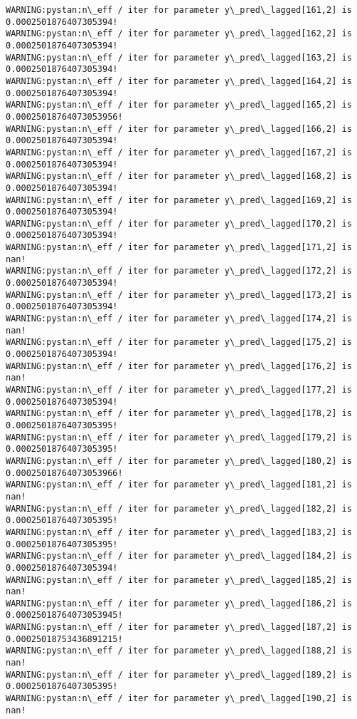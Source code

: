 \documentclass[11pt]{article}
\begin{document}
\begin{Verbatim}[commandchars=\\\{\}]
WARNING:pystan:n\_eff / iter for parameter y\_pred\_lagged[161,2] is 0.0002501876407305394!
WARNING:pystan:n\_eff / iter for parameter y\_pred\_lagged[162,2] is 0.0002501876407305394!
WARNING:pystan:n\_eff / iter for parameter y\_pred\_lagged[163,2] is 0.0002501876407305394!
WARNING:pystan:n\_eff / iter for parameter y\_pred\_lagged[164,2] is 0.0002501876407305394!
WARNING:pystan:n\_eff / iter for parameter y\_pred\_lagged[165,2] is 0.00025018764073053956!
WARNING:pystan:n\_eff / iter for parameter y\_pred\_lagged[166,2] is 0.0002501876407305394!
WARNING:pystan:n\_eff / iter for parameter y\_pred\_lagged[167,2] is 0.0002501876407305394!
WARNING:pystan:n\_eff / iter for parameter y\_pred\_lagged[168,2] is 0.0002501876407305394!
WARNING:pystan:n\_eff / iter for parameter y\_pred\_lagged[169,2] is 0.0002501876407305394!
WARNING:pystan:n\_eff / iter for parameter y\_pred\_lagged[170,2] is 0.0002501876407305394!
WARNING:pystan:n\_eff / iter for parameter y\_pred\_lagged[171,2] is nan!
WARNING:pystan:n\_eff / iter for parameter y\_pred\_lagged[172,2] is 0.0002501876407305394!
WARNING:pystan:n\_eff / iter for parameter y\_pred\_lagged[173,2] is 0.0002501876407305394!
WARNING:pystan:n\_eff / iter for parameter y\_pred\_lagged[174,2] is nan!
WARNING:pystan:n\_eff / iter for parameter y\_pred\_lagged[175,2] is 0.0002501876407305394!
WARNING:pystan:n\_eff / iter for parameter y\_pred\_lagged[176,2] is nan!
WARNING:pystan:n\_eff / iter for parameter y\_pred\_lagged[177,2] is 0.0002501876407305394!
WARNING:pystan:n\_eff / iter for parameter y\_pred\_lagged[178,2] is 0.0002501876407305395!
WARNING:pystan:n\_eff / iter for parameter y\_pred\_lagged[179,2] is 0.0002501876407305395!
WARNING:pystan:n\_eff / iter for parameter y\_pred\_lagged[180,2] is 0.00025018764073053966!
WARNING:pystan:n\_eff / iter for parameter y\_pred\_lagged[181,2] is nan!
WARNING:pystan:n\_eff / iter for parameter y\_pred\_lagged[182,2] is 0.0002501876407305395!
WARNING:pystan:n\_eff / iter for parameter y\_pred\_lagged[183,2] is 0.0002501876407305395!
WARNING:pystan:n\_eff / iter for parameter y\_pred\_lagged[184,2] is 0.0002501876407305394!
WARNING:pystan:n\_eff / iter for parameter y\_pred\_lagged[185,2] is nan!
WARNING:pystan:n\_eff / iter for parameter y\_pred\_lagged[186,2] is 0.00025018764073053945!
WARNING:pystan:n\_eff / iter for parameter y\_pred\_lagged[187,2] is 0.00025018753436891215!
WARNING:pystan:n\_eff / iter for parameter y\_pred\_lagged[188,2] is nan!
WARNING:pystan:n\_eff / iter for parameter y\_pred\_lagged[189,2] is 0.0002501876407305395!
WARNING:pystan:n\_eff / iter for parameter y\_pred\_lagged[190,2] is nan!

\end{Verbatim}
\end{document}
